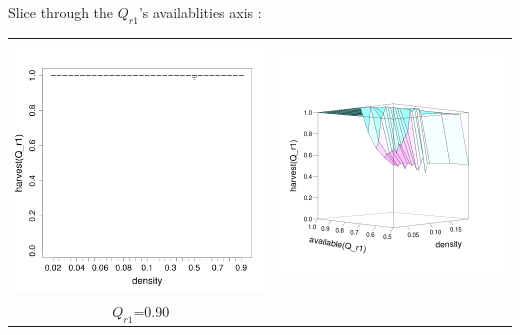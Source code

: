 \documentclass[8pt, handout=show,notes=show]{beamer}
\begin{document}
\begin{frame}{ Slice through the $Q_{r1}$'s availablities axis : }
\begin{table}[H]
\begin{tabular}{cc}
			\includegraphics[width=\imgSize]{images/harvestr1_density_r1-90.png}&
			\includegraphics[width=\imgSize]{images/R1_median}\\
			$Q_{r1}$=0.90&\\
		\end{tabular}

	\end{table}

\end{frame}
\end{document}
